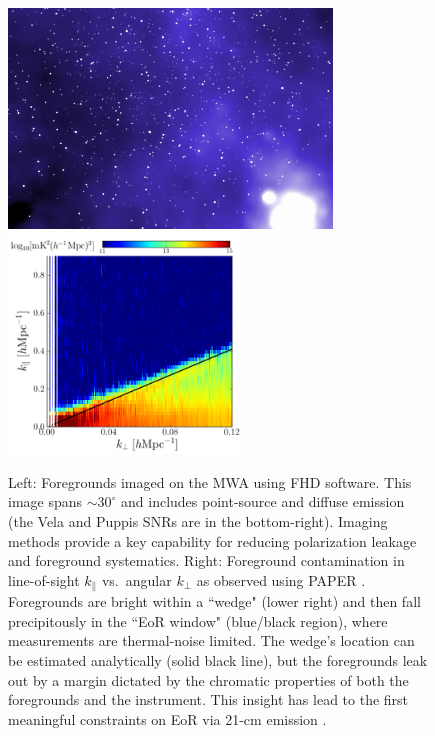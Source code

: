 \documentclass[preprint]{aastex}
\def\kperp{k_{\bot}}
\def\kpar{k_{\|}}
\begin{document}
\begin{figure}[t] \centering
\includegraphics[height=2.3in]{plots/MWApretty_crop.png} 
\includegraphics[height=2.3in]{plots/wedge_tall_wide.png} \caption{\small Left:
Foregrounds imaged on the MWA using FHD software.
This image spans $\sim$$30^{\circ}$ and
includes point-source and diffuse emission (the Vela and Puppis SNRs are in the
bottom-right). Imaging methods provide a key capability for reducing
polarization leakage and foreground systematics.  
Right: Foreground contamination in line-of-sight $\kpar$ vs.\ angular $\kperp$
as observed using PAPER \citep{pober_et_al2013}.
Foregrounds are bright within a ``wedge" (lower right) and then fall 
precipitously in the ``EoR window" (blue/black 
region), where measurements are thermal-noise limited.  The wedge's location can 
be estimated analytically (solid black line), but the foregrounds leak out by a margin 
dictated by the chromatic properties of both the foregrounds and the instrument.
This insight has lead to the
first meaningful constraints on EoR via 21-cm emission
\citep{parsons_et_al2013}.
}\label{fig:twoFGViews} \end{figure}
\end{document}
